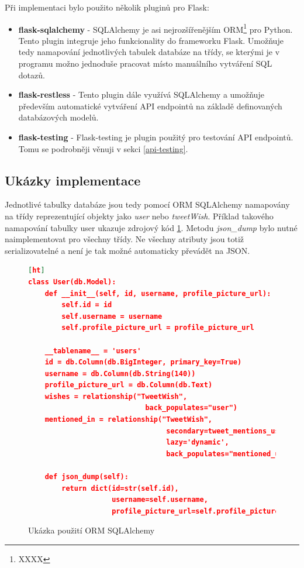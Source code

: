 \documentclass[thesis=B,czech]{FITthesis}[2012/06/26]
\begin{document}
\noindent Při implementaci bylo použito několik pluginů pro Flask:
	
\begin{itemize}
\item \textbf{flask-sqlalchemy} - SQLAlchemy je asi nejrozšířenějším ORM\footnote{XXXX} pro Python. Tento plugin integruje jeho funkcionality do frameworku Flask. Umožňuje tedy namapování jednotlivých tabulek databáze na třídy, se kterými je v programu možno jednoduše pracovat místo manuálního vytváření SQL dotazů. 
\item \textbf{flask-restless} - Tento plugin dále využívá SQLAlchemy a umožňuje především automatické vytváření API endpointů na základě definovaných databázových modelů. 
\item \textbf{flask-testing} - Flask-testing je plugin použitý pro testování API endpointů. Tomu se podrobněji věnuji v sekci \ref{api-testing}.
\end{itemize}

\subsection{Ukázky implementace}
Jednotlivé tabulky databáze jsou tedy pomocí ORM SQLAlchemy namapovány na třídy reprezentující objekty jako \textit{user} nebo \textit{tweetWish}. Příklad takového namapování tabulky user ukazuje zdrojový kód \ref{fig:user-orm}. Metodu \textit{json\_dump} bylo nutné naimplementovat pro všechny třídy. Ne všechny atributy jsou totiž serializovatelné a není je tak možné automaticky převádět na JSON. 

\begin{figure}
\begin{lstlisting}[language=json,firstnumber=1][ht]
class User(db.Model):
	def __init__(self, id, username, profile_picture_url):
		self.id = id
		self.username = username
		self.profile_picture_url = profile_picture_url

	__tablename__ = 'users'
	id = db.Column(db.BigInteger, primary_key=True)
	username = db.Column(db.String(140))
	profile_picture_url = db.Column(db.Text)
	wishes = relationship("TweetWish",
							back_populates="user")
	mentioned_in = relationship("TweetWish",
    							 secondary=tweet_mentions_user,
								 lazy='dynamic',
								 back_populates="mentioned_users")

	def json_dump(self):
		return dict(id=str(self.id),
					username=self.username,
					profile_picture_url=self.profile_picture_url)
\end{lstlisting}
\caption{Ukázka použití ORM SQLAlchemy}
\label{fig:user-orm}
\end{figure} 
\end{document}
